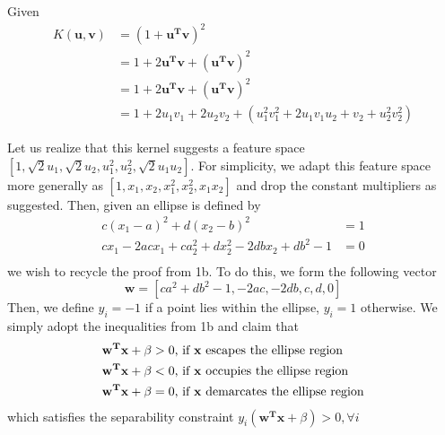 \documentclass{article}
\begin{document}
Given
\begin{align*}
  K(\mathbf{u},\mathbf{v}) &= (1 + \mathbf{u^Tv})^2\\
  &= 1+2\mathbf{u^Tv}+(\mathbf{u^Tv})^2\\
  &= 1+2\mathbf{u^Tv}+(\mathbf{u^Tv})^2\\
  &= 1+2u_1v_1+2u_2v_2+(u_1^2v_1^2+2u_1v_1u_2+v_2 + u_2^2v_2^2)
\end{align*}

Let us realize that this kernel suggests a feature space
\([1, \sqrt{2}u_1, \sqrt{2}u_2, u_1^2, u_2^2, \sqrt{2}u_1u_2]\). For simplicity,
we adapt this feature space more generally as \([1, x_1, x_2, x_1^2, x_2^2, x_1x_2]\)
and drop the constant multipliers as suggested. Then, given an ellipse is defined by
\begin{align*}
  c(x_1-a)^2 + d(x_2-b)^2  &= 1\\
  cx_1-2acx_1 + ca_2^2 + dx_2^2 - 2dbx_2 + db^2 - 1 &= 0\\
\end{align*}
we wish to recycle the proof from 1b. To do this, we form the following vector
\begin{equation*}
  \mathbf{w} = [ca^2+db^2-1, -2ac, -2db, c, d, 0]
\end{equation*}
Then, we define \(y_i = -1 \) if a point lies within the ellipse, \(y_i = 1 \) otherwise.
We simply adopt the inequalities from 1b and claim that
\begin{align*}
  \mathbf{w^{T}x}+\beta & >0\textnormal{, if }\mathbf{x}\textnormal{ escapes the ellipse region}\\
  \mathbf{w^{T}x}+\beta & <0\textnormal{, if }\mathbf{x}\textnormal{ occupies the ellipse region}\\
  \mathbf{w^{T}x}+\beta & =0\textnormal{, if }\mathbf{x}\textnormal{ demarcates the ellipse region}
\end{align*}
which satisfies the separability constraint \(y_{i}(\mathbf{w^{T}x}+\beta)>0,\forall i\)
\end{document}
